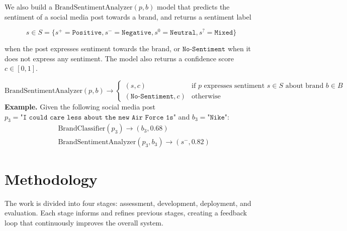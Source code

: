 \documentclass{article}
\begin{document}
We also build a $\mathrm{BrandSentimentAnalyzer}(p, b)$ model that predicts
the sentiment of a social media post towards a brand, and returns a sentiment
label

\[
    s \in S =
    \{
    s^{+}=\texttt{Positive},
    s^{-}=\texttt{Negative},
    s^{0}=\texttt{Neutral},
    s^{?}=\texttt{Mixed}
    \}
\]

when the post expresses sentiment towards the brand, or $\texttt{No-Sentiment}$
when it does not express any sentiment. The model also returns a confidence
score $c \in [0, 1]$.

\[
    \mathrm{BrandSentimentAnalyzer}(p, b) \rightarrow \begin{cases}
        (s, c)                     & \text{if } p \text{ expresses sentiment }
        s \in S \text{ about brand } b \in B
        \\
        (\texttt{No-Sentiment}, c) & \text{otherwise}
    \end{cases}
\]
\textbf{Example.} Given the following social media post $p_3 = \texttt{"I could
        care less about the new Air Force 1s"}$ and $b_3 = \texttt{"Nike"}$:
\begin{align*}
     & \mathrm{BrandClassifier}(p_3) \rightarrow (b_3, 0.68)               \\
     & \mathrm{BrandSentimentAnalyzer}(p_3, b_3) \rightarrow (s^{-}, 0.82)
\end{align*}

\newpage

\section*{Methodology}

The work is divided into four stages: assessment, development, deployment, and
evaluation. Each stage informs and refines previous stages, creating a feedback
loop that continuously improves the overall system.
\end{document}
